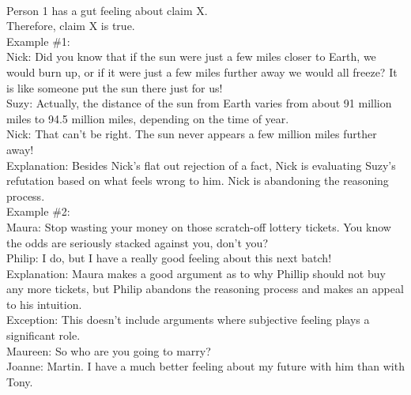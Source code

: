 \documentclass[a4paper,12pt,single,pdftex]{scrartcl}
\begin{document}
    \\

    
      Person 1 has a gut feeling about claim X.
    \\

    
      Therefore, claim X is true.
    \\

    
      Example \#1:
    \\

    
      Nick: Did you know that if the sun were just a few miles closer to Earth, we would burn up, or if it were just a few miles further away we would all freeze? It is like someone put the sun there just for us!
    \\

    
      Suzy: Actually, the distance of the sun from Earth varies from about 91 million miles to 94.5 million miles, depending on the time of year.
    \\

    
      Nick: That can't be right. The sun never appears a few million miles further away!
    \\

    
      Explanation: Besides Nick's flat out rejection of a fact, Nick is evaluating Suzy's refutation based on what feels wrong to him. Nick is abandoning the reasoning process.
    \\

    
      Example \#2:
    \\

    
      Maura: Stop wasting your money on those scratch-off lottery tickets. You know the odds are seriously stacked against you, don't you?
    \\

    
      Philip: I do, but I have a really good feeling about this next batch!
    \\

    
      Explanation: Maura makes a good argument as to why Phillip should not buy any more tickets, but Philip abandons the reasoning process and makes an appeal to his intuition.
    \\

    
      Exception: This doesn't include arguments where subjective feeling plays a significant role.
    \\

    
      Maureen: So who are you going to marry?
    \\

    
      Joanne: Martin. I have a much better feeling about my future with him than with Tony.
    \\
\end{document}
